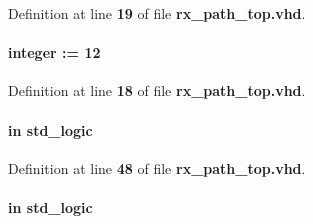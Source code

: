 Definition at line {\bf 19} of file {\bf rx\+\_\+path\+\_\+top.\+vhd}.

\paragraph[{iq\+\_\+width}]{ {\bfseries \textcolor{vhdlchar}{ }} {\bfseries \textcolor{comment}{integer}\textcolor{vhdlchar}{ }\textcolor{vhdlchar}{ }\textcolor{vhdlchar}{\+:}\textcolor{vhdlchar}{=}\textcolor{vhdlchar}{ }\textcolor{vhdlchar}{ } \textcolor{vhdldigit}{12} \textcolor{vhdlchar}{ }} \hspace{0.3cm}{\ttfamily [Generic]}}\label{classrx__path__top_ad9eb9b875b008b241e3b7e7c8ff4b62a}


Definition at line {\bf 18} of file {\bf rx\+\_\+path\+\_\+top.\+vhd}.

\paragraph[{ld\+\_\+smpl\+\_\+nr}]{ {\bfseries \textcolor{keywordflow}{in}\textcolor{vhdlchar}{ }} {\bfseries \textcolor{comment}{std\+\_\+logic}\textcolor{vhdlchar}{ }} \hspace{0.3cm}{\ttfamily [Port]}}\label{classrx__path__top_a1f26d2aae332408be5b7e9b12ae129ce}


Definition at line {\bf 48} of file {\bf rx\+\_\+path\+\_\+top.\+vhd}.

\paragraph[{mimo\+\_\+en}]{ {\bfseries \textcolor{keywordflow}{in}\textcolor{vhdlchar}{ }} {\bfseries \textcolor{comment}{std\+\_\+logic}\textcolor{vhdlchar}{ }} \hspace{0.3cm}{\ttfamily [Port]}}\label{classrx__path__top_a0c57670aee4f9fbfa3c286573012965a}


